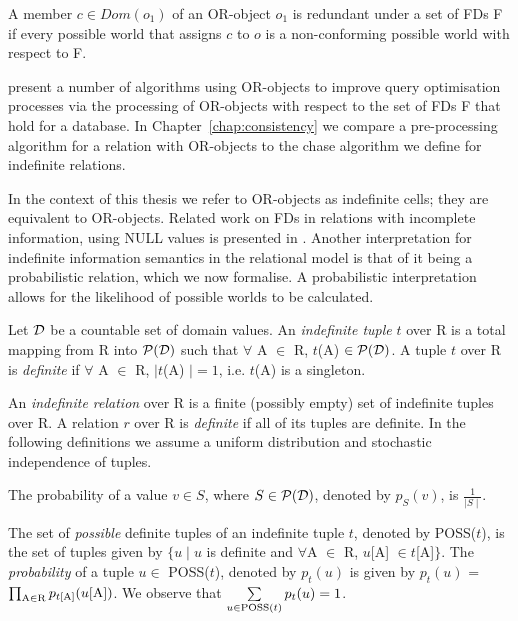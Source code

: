 \begin{definition}
\begin{rm}
A member $c \in Dom(o_1)$ of an OR-object $o_1$ is redundant under a set of
FDs F if every possible world that assigns $c$ to $o$ is
a non-conforming possible world with respect to F.
\end{rm}
\end{definition}

\cite{vn95} present a number of algorithms using OR-objects to improve query 
optimisation processes via the processing of OR-objects with respect to the
set of FDs F that hold for a database. In
Chapter~\ref{chap:consistency} we compare a pre-processing algorithm
for a relation with OR-objects to the chase algorithm we define for
indefinite relations.

\smallskip

In the context of this thesis we
refer to OR-objects as indefinite cells; they are equivalent to OR-objects.
Related
work on FDs in relations with incomplete information, using NULL
values is presented in \cite{ll98,lv97}. 
Another interpretation for indefinite information semantics in the
relational model is that of it being a probabilistic relation, which
we now formalise. A probabilistic interpretation allows for the
likelihood of possible worlds to be calculated.

\begin{definition}
\begin{rm}
Let $\cal D$ be a countable set of domain values.
An {\em indefinite tuple} $t$ over R 
is a total mapping from R into ${\cal P}({\cal D})$ 
such that $\forall$ A $\in$ R, $t$(A) $\in {\cal P}({\cal D})$.
A tuple $t$ over R is {\em definite} if 
$\forall$ A $\in$ R, $\mid t$(A) $\mid = 1$, i.e. $t$(A) is a singleton.
\end{rm}
\end{definition}

An {\em indefinite relation} over R 
is a finite (possibly empty) set of indefinite tuples over R.
A relation $r$ over R is {\em definite} if all of its tuples are definite.
In the following definitions we assume a uniform distribution and
stochastic independence of tuples.

\begin{definition}
\begin{rm}
The probability of a value $v \in S$, where  $S \in {\cal P}({\cal D})$,
denoted by $p_S(v)$, is $\frac{1}{\mid S \mid}$.

\smallskip

The set of {\em possible} definite tuples of an indefinite tuple $t$, 
denoted by POSS($t$), is the set of tuples given by $\{u \mid u$ is
definite and $\forall$A $\in$ R, $u$[A] $\in t$[A]$\}$. The {\em probability}
of a tuple $u \in$ POSS($t$), denoted by $p_t(u)$ is given by $p_t(u)$
= $\prod_{{\rm A} \in {\rm R}} p_{t[{\rm A}]}(u[{\rm A}])$. We observe
that $\sum\limits_{u \in {\rm POSS}(t)} p_t(u) = 1$.  
\end{rm}
\end{definition}


